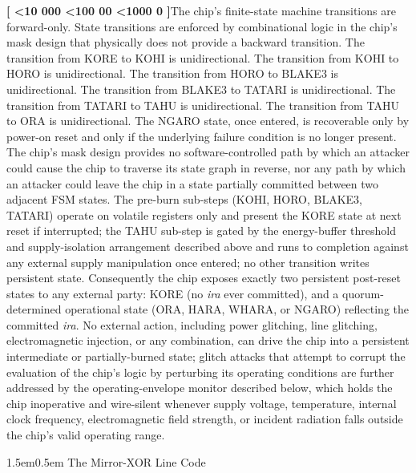 \documentclass[12pt,letterpaper]{article}
\makeatletter
\newcounter{para}
\newcommand{\padzero}{%
  \ifnum\value{para}<10 000\else%
  \ifnum\value{para}<100 00\else%
  \ifnum\value{para}<1000 0\else%
  \fi\fi\fi}
\newcommand{\para}{%
  \refstepcounter{para}\noindent\textbf{[\padzero\arabic{para}]}\hspace{0.5em}\ignorespaces}
\renewcommand{\subsection}{\@startsection{subsection}{2}{0pt}%
  {1.5em}{0.5em}%
  {\normalfont\normalsize\bfseries}}
\makeatother
\begin{document}
\para The chip's finite-state machine transitions are forward-only. State transitions are enforced by combinational logic in the chip's mask design that physically does not provide a backward transition. The transition from KORE to KOHI is unidirectional. The transition from KOHI to HORO is unidirectional. The transition from HORO to BLAKE3 is unidirectional. The transition from BLAKE3 to TATARI is unidirectional. The transition from TATARI to TAHU is unidirectional. The transition from TAHU to ORA is unidirectional. The NGARO state, once entered, is recoverable only by power-on reset and only if the underlying failure condition is no longer present. The chip's mask design provides no software-controlled path by which an attacker could cause the chip to traverse its state graph in reverse, nor any path by which an attacker could leave the chip in a state partially committed between two adjacent FSM states. The pre-burn sub-steps (KOHI, HORO, BLAKE3, TATARI) operate on volatile registers only and present the KORE state at next reset if interrupted; the TAHU sub-step is gated by the energy-buffer threshold and supply-isolation arrangement described above and runs to completion against any external supply manipulation once entered; no other transition writes persistent state. Consequently the chip exposes exactly two persistent post-reset states to any external party: KORE (no \emph{ira} ever committed), and a quorum-determined operational state (ORA, HARA, WHARA, or NGARO) reflecting the committed \emph{ira}. No external action, including power glitching, line glitching, electromagnetic injection, or any combination, can drive the chip into a persistent intermediate or partially-burned state; glitch attacks that attempt to corrupt the evaluation of the chip's logic by perturbing its operating conditions are further addressed by the operating-envelope monitor described below, which holds the chip inoperative and wire-silent whenever supply voltage, temperature, internal clock frequency, electromagnetic field strength, or incident radiation falls outside the chip's valid operating range.

\subsection{The Mirror-XOR Line Code}
\end{document}
